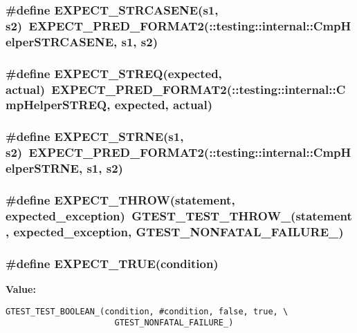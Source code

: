 \subsubsection{\setlength{\rightskip}{0pt plus 5cm}\#define EXPECT\_\-STRCASENE(s1, s2)~EXPECT\_\-PRED\_\-FORMAT2(::testing::internal::CmpHelperSTRCASENE, s1, s2)}\label{gtest_8h_aeea193c70fcfc82b0c83c3dc51307dd}


\subsubsection{\setlength{\rightskip}{0pt plus 5cm}\#define EXPECT\_\-STREQ(expected, actual)~EXPECT\_\-PRED\_\-FORMAT2(::testing::internal::CmpHelperSTREQ, expected, actual)}\label{gtest_8h_0876b77880bfd56fe012815bc4ff9ed5}


\subsubsection{\setlength{\rightskip}{0pt plus 5cm}\#define EXPECT\_\-STRNE(s1, s2)~EXPECT\_\-PRED\_\-FORMAT2(::testing::internal::CmpHelperSTRNE, s1, s2)}\label{gtest_8h_647e43522cc2175b566ba531b461a0b5}


\subsubsection{\setlength{\rightskip}{0pt plus 5cm}\#define EXPECT\_\-THROW(statement, expected\_\-exception)~GTEST\_\-TEST\_\-THROW\_\-(statement, expected\_\-exception, GTEST\_\-NONFATAL\_\-FAILURE\_\-)}\label{gtest_8h_3575afec9214ef9782034ae9305102f5}


\subsubsection{\setlength{\rightskip}{0pt plus 5cm}\#define EXPECT\_\-TRUE(condition)}\label{gtest_8h_0954fea9252af6aea1df2d8e6e6caa0e}


\textbf{Value:}

\begin{Code}\begin{verbatim}GTEST_TEST_BOOLEAN_(condition, #condition, false, true, \
                      GTEST_NONFATAL_FAILURE_)
\end{verbatim}
\end{Code}
